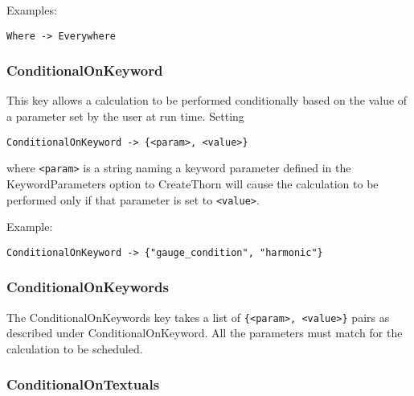 \documentclass{report}
\begin{document}
Examples:
\begin{center}
\begin{minipage}{0.8 \textwidth}
\begin{verbatim}
Where -> Everywhere
\end{verbatim}
\end{minipage}
\end{center}

\subsubsection{ConditionalOnKeyword}

This key allows a calculation to be performed conditionally based on
the value of a parameter set by the user at run time.  Setting
\begin{center}
\begin{minipage}{0.8 \textwidth}
\begin{verbatim}
ConditionalOnKeyword -> {<param>, <value>}
\end{verbatim}
\end{minipage}
\end{center}
where \verb|<param>| is a string naming a keyword parameter defined in
the KeywordParameters option to CreateThorn will cause the calculation
to be performed only if that parameter is set to \verb|<value>|.

Example:

\begin{center}
\begin{minipage}{0.8 \textwidth}
\begin{verbatim}
ConditionalOnKeyword -> {"gauge_condition", "harmonic"}
\end{verbatim}
\end{minipage}
\end{center}

\subsubsection{ConditionalOnKeywords}

The ConditionalOnKeywords key takes a list of
\verb|{<param>, <value>}| pairs as described under
ConditionalOnKeyword.  All the parameters must match for the
calculation to be scheduled.

\subsubsection{ConditionalOnTextuals}
\end{document}
